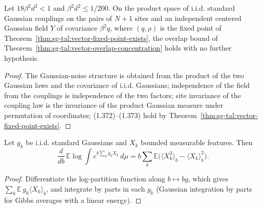 \begin{theorem}\label{thm:sg-tal:vector-overlap-concrete}
\leanok
{}
Let $18\beta^2d^2<1$ and $\beta^2d^2\le1/200$. On the product space of i.i.d. standard Gaussian couplings on the pairs of $N+1$ sites and an independent centered Gaussian field $Y$ of covariance $\beta^2q$, where $(q,\rho)$ is the fixed point of Theorem~\ref{thm:sg-tal:vector-fixed-point-exists}, the overlap bound of Theorem~\ref{thm:sg-tal:vector-overlap-concentration} holds with no further hypothesis.
\end{theorem}
\begin{proof}
\leanok
The Gaussian-noise structure is obtained from the product of the two Gaussian laws and the covariance of i.i.d. Gaussians; independence of the field from the couplings is independence of the two factors; site invariance of the coupling law is the invariance of the product Gaussian measure under permutation of coordinates; (1.372)--(1.373) hold by Theorem~\ref{thm:sg-tal:vector-fixed-point-exists}.
\end{proof}

\begin{lemma}\label{lem:sg-tal:gibbs-temperature-derivative}
\leanok
{}
Let $g_k$ be i.i.d. standard Gaussians and $X_k$ bounded measurable features. Then
\[
\frac{d}{db}\,\mathbb E\log\int e^{b\sum_kg_kX_k}\,d\mu=b\sum_k\mathbb E\bigl(\langle X_k^2\rangle_b-\langle X_k\rangle_b^2\bigr).
\]
\end{lemma}
\begin{proof}
\leanok
Differentiate the log-partition function along $b\mapsto bg$, which gives $\sum_k\mathbb E\,g_k\langle X_k\rangle_b$, and integrate by parts in each $g_k$ (Gaussian integration by parts for Gibbs averages with a linear energy).
\end{proof}

